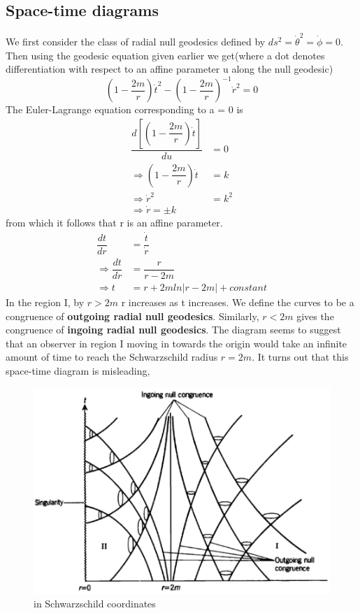 \documentclass[12pt,a4paper]{article}
\numberwithin{table}{section}
\numberwithin{figure}{section}
\numberwithin{equation}{section}
\theoremstyle{remark}
\theoremstyle{definition}
\begin{document}
\subsection{Space-time diagrams}
We first consider the class of radial null geodesics defined by $ds^2=\dot{\theta}^2=\dot{\phi}=0$. Then using the geodesic equation given earlier we get(where a dot denotes differentiation with respect to an affine parameter u along the null geodesic)
$$\left(1-\dfrac{2m}{r}\right)\dot{t}^2-\left(1-\dfrac{2m}{r}\right)^{-1}\dot{r}^2=0$$
The Euler-Lagrange equation corresponding to a = 0 is
\begin{align*}
    \dfrac{d\left[\left(1-\dfrac{2m}{r}\right)\dot{t}\right]}{du}&=0\\
    \Rightarrow\left(1-\dfrac{2m}{r}\right)\dot{t}&=k\\
    \Rightarrow \dot{r}^2&=k^2\\
    \Rightarrow \dot{r}=\pm k
\end{align*}
from which it follows that r is an affine parameter.
\begin{align*}
    \dfrac{dt}{dr}&=\dfrac{\dot{t}}{\dot{r}}\\
    \Rightarrow\dfrac{dt}{dr}&=\dfrac{r}{r-2m}\\
    \Rightarrow t&=r+2mln|r-2m|+constant
\end{align*}
In the region I, by $r>2m$ r increases as t increases. We define the curves to be a congruence of \textbf{outgoing radial null geodesics}. Similarly, $r<2m$ gives the congruence of \textbf{ingoing radial null geodesics}. The diagram seems to suggest that an observer in region I moving in towards the origin would take an infinite amount of time to reach the Schwarzschild radius $r=2m$. It turns out that this space-time diagram is misleading, 
\begin{figure}[H]
    \centering
  \includegraphics[scale=0.6]{st1}
  \caption{in Schwarzschild coordinates}
  \label{fig:deviation}
\end{figure}
\end{document}
